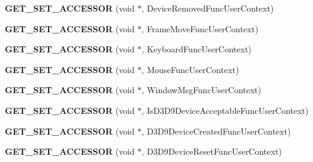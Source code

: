 \begin{DoxyCompactItemize}
\item 
\hypertarget{class_d_x_u_t_state_afb31fc4d8f02bdd64db67c7ea90f4188}{{\bfseries G\+E\+T\+\_\+\+S\+E\+T\+\_\+\+A\+C\+C\+E\+S\+S\+O\+R} (void $\ast$, Device\+Removed\+Func\+User\+Context)}\label{class_d_x_u_t_state_afb31fc4d8f02bdd64db67c7ea90f4188}

\item 
\hypertarget{class_d_x_u_t_state_a651459e8ec073b9e117fc074f3b912b8}{{\bfseries G\+E\+T\+\_\+\+S\+E\+T\+\_\+\+A\+C\+C\+E\+S\+S\+O\+R} (void $\ast$, Frame\+Move\+Func\+User\+Context)}\label{class_d_x_u_t_state_a651459e8ec073b9e117fc074f3b912b8}

\item 
\hypertarget{class_d_x_u_t_state_aa4c17cd6e0f634979e9d8619ac3ac713}{{\bfseries G\+E\+T\+\_\+\+S\+E\+T\+\_\+\+A\+C\+C\+E\+S\+S\+O\+R} (void $\ast$, Keyboard\+Func\+User\+Context)}\label{class_d_x_u_t_state_aa4c17cd6e0f634979e9d8619ac3ac713}

\item 
\hypertarget{class_d_x_u_t_state_a28dca11fe4d9f6866e95ae7ac5315f64}{{\bfseries G\+E\+T\+\_\+\+S\+E\+T\+\_\+\+A\+C\+C\+E\+S\+S\+O\+R} (void $\ast$, Mouse\+Func\+User\+Context)}\label{class_d_x_u_t_state_a28dca11fe4d9f6866e95ae7ac5315f64}

\item 
\hypertarget{class_d_x_u_t_state_a96022044bf967804215da24ffd507bb1}{{\bfseries G\+E\+T\+\_\+\+S\+E\+T\+\_\+\+A\+C\+C\+E\+S\+S\+O\+R} (void $\ast$, Window\+Msg\+Func\+User\+Context)}\label{class_d_x_u_t_state_a96022044bf967804215da24ffd507bb1}

\item 
\hypertarget{class_d_x_u_t_state_a297c5d673eb40c09a23571361d962638}{{\bfseries G\+E\+T\+\_\+\+S\+E\+T\+\_\+\+A\+C\+C\+E\+S\+S\+O\+R} (void $\ast$, Is\+D3\+D9\+Device\+Acceptable\+Func\+User\+Context)}\label{class_d_x_u_t_state_a297c5d673eb40c09a23571361d962638}

\item 
\hypertarget{class_d_x_u_t_state_a2304be14a2b11cc931024ef061f12b8c}{{\bfseries G\+E\+T\+\_\+\+S\+E\+T\+\_\+\+A\+C\+C\+E\+S\+S\+O\+R} (void $\ast$, D3\+D9\+Device\+Created\+Func\+User\+Context)}\label{class_d_x_u_t_state_a2304be14a2b11cc931024ef061f12b8c}

\item 
\hypertarget{class_d_x_u_t_state_a580b4d72a3a0a1e9b1c19d35cda92ec0}{{\bfseries G\+E\+T\+\_\+\+S\+E\+T\+\_\+\+A\+C\+C\+E\+S\+S\+O\+R} (void $\ast$, D3\+D9\+Device\+Reset\+Func\+User\+Context)}\label{class_d_x_u_t_state_a580b4d72a3a0a1e9b1c19d35cda92ec0}


\end{DoxyCompactItemize}
